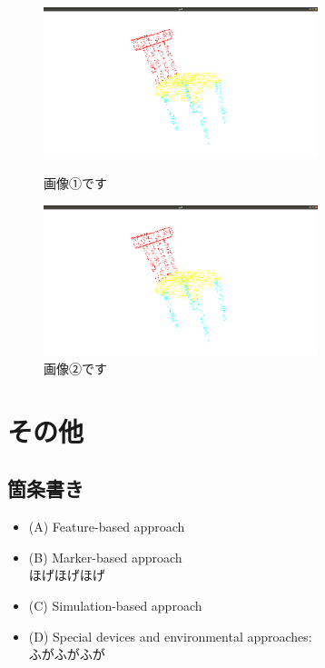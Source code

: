 \documentclass[a4j,uplatex,titlepage]{jsarticle}
\begin{document}
\begin{figure}[tb]
    \begin{minipage}[b]{0.48\columnwidth}
      \centering
      \includegraphics[width=8cm]{figure/pcl.png}
      \caption{画像①です}
    \end{minipage}
    \hspace{0.04\columnwidth} %
    \begin{minipage}[b]{0.48\columnwidth}
      \centering
      \includegraphics[width=8cm]{figure/pcl.png}
      \caption{画像②です}
    \end{minipage}
  \end{figure}

\section{その他}
\subsection{箇条書き}
\begin{itemize}
    \item (A) Feature-based approach\\ 
    \item (B) Marker-based approach\mbox{}\\
    ほげほげほげ
    \item (C) Simulation-based approach\\ 
    \item (D) Special devices and environmental approaches:\mbox{}\\
    ふがふがふが 
\end{itemize}
\end{document}
